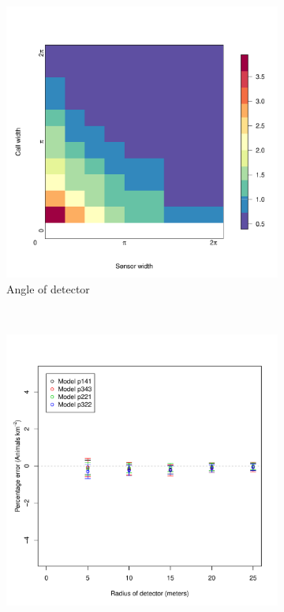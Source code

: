\documentclass[a4paper,10pt,reqno,oneside]{amsart}
\begin{document}
\begin{figure}[t]
        \centering
	\begin{subfigure}[t]{0.5\textwidth}
		\includegraphics[width=1\textwidth]{imgs/ResultStandardDeviation.pdf}
		\caption{Angle of detector}
		\label{f:StandardDevaition}
	\end{subfigure}
	~
	 \begin{subfigure}[t]{0.5\textwidth}
                \centering
		\includegraphics[width=1\textwidth]{imgs/ResultsRadii.pdf}

\end{subfigure}
\end{figure}
\end{document}
